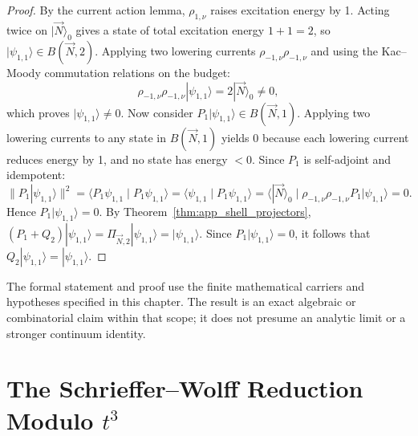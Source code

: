 \begin{proof}
By the current action lemma, $\rho_{1, \nu}$ raises excitation energy by 1. Acting twice on $|\vec{N}\rangle_0$ gives a state of total excitation energy $1 + 1 = 2$, so $|\psi_{1, 1}\rangle \in B(\vec{N}, 2)$.
Applying two lowering currents $\rho_{-1, \nu} \rho_{-1, \nu}$ and using the Kac--Moody commutation relations on the budget:
\[
\rho_{-1, \nu} \rho_{-1, \nu} |\psi_{1, 1}\rangle = 2 |\vec{N}\rangle_0 \neq 0,
\]
which proves $|\psi_{1, 1}\rangle \neq 0$.
Now consider $P_1 |\psi_{1, 1}\rangle \in B(\vec{N}, 1)$. Applying two lowering currents to any state in $B(\vec{N}, 1)$ yields 0 because each lowering current reduces energy by 1, and no state has energy $< 0$.
Since $P_1$ is self-adjoint and idempotent:
\[
\|P_1 |\psi_{1, 1}\rangle\|^2 = \langle P_1 \psi_{1, 1} \mid P_1 \psi_{1, 1} \rangle = \langle \psi_{1, 1} \mid P_1 \psi_{1, 1} \rangle = \langle |\vec{N}\rangle_0 \mid \rho_{-1, \nu} \rho_{-1, \nu} P_1 |\psi_{1, 1}\rangle = 0.
\]
Hence $P_1 |\psi_{1, 1}\rangle = 0$.
By Theorem~\ref{thm:app_shell_projectors}, $(P_1 + Q_2)|\psi_{1, 1}\rangle = \Pi_{\vec{N}, 2} |\psi_{1, 1}\rangle = |\psi_{1, 1}\rangle$. Since $P_1 |\psi_{1, 1}\rangle = 0$, it follows that $Q_2 |\psi_{1, 1}\rangle = |\psi_{1, 1}\rangle$.
\end{proof}

\begin{remark}
The formal statement and proof use the finite mathematical carriers and hypotheses specified in this chapter. The result is an exact algebraic or combinatorial claim within that scope; it does not presume an analytic limit or a stronger continuum identity.
\end{remark}

\section[The Schrieffer--Wolff Reduction Modulo t3]{The Schrieffer--Wolff Reduction Modulo $t^3$}

